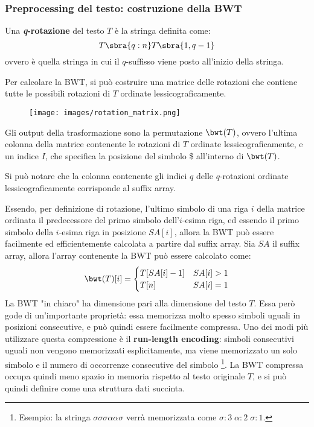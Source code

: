 \subsubsection{Preprocessing del testo: costruzione della BWT}
\begin{defn}
    Una \textbf{\textit{q}-rotazione} del testo $T$ è la stringa definita come:
    \[
        T\sbra{q:n}T\sbra{1, q-1}
    \]
    ovvero è quella stringa in cui il $q$-suffisso viene posto all'inizio della stringa.
\end{defn}
Per calcolare la BWT, si può costruire una matrice delle rotazioni che contiene tutte le possibili rotazioni di $T$ ordinate lessicograficamente.
\begin{figure}[h]
    \centering
    \texttt{[image: images/rotation\_matrix.png]}
    \caption{}
    \label{fig:rotation_matrix}
\end{figure}
\begin{defn}
    Gli output della trasformazione sono la permutazione $\bwt(T)$, ovvero l'ultima colonna della matrice contenente le rotazioni di $T$ ordinate lessicograficamente, e un indice $I$, che specifica la posizione del simbolo \$ all'interno di $\bwt(T)$.
\end{defn}
\begin{rem}
    Si può notare che la colonna contenente gli indici $q$ delle $q$-rotazioni ordinate lessicograficamente corrisponde al suffix array.
\end{rem}
Essendo, per definizione di rotazione, l'ultimo simbolo di una riga $i$ della matrice ordinata il predecessore del primo simbolo dell'$i$-esima riga, ed essendo il primo simbolo della $i$-esima riga in posizione $SA[i]$, allora la BWT può essere facilmente ed efficientemente calcolata a partire dal suffix array. Sia $SA$ il suffix array, allora l'array contenente la BWT può essere calcolato come:
\[
    \bwt(T)[i] = \begin{cases}
        T[SA[i]-1] & SA[i] > 1 \\
        T[n] & SA[i] = 1
    \end{cases}
\]
La BWT "in chiaro" ha dimensione pari alla dimensione del testo $T$. Essa però gode di un'importante proprietà: essa memorizza molto spesso simboli uguali in posizioni consecutive, e può quindi essere facilmente compressa. Uno dei modi più utilizzare questa compressione è il \textbf{run-length encoding}: simboli consecutivi uguali non vengono memorizzati esplicitamente, ma viene memorizzato un solo simbolo e il numero di occorrenze consecutive del simbolo 
\footnote{Esempio: la stringa $\sigma \sigma \sigma \alpha \alpha \sigma$ verrà memorizzata come $\sigma : 3 \; \alpha : 2 \; \sigma : 1$.}.
La BWT compressa occupa quindi meno spazio in memoria rispetto al testo originale $T$, e si può quindi definire come una struttura dati succinta.

